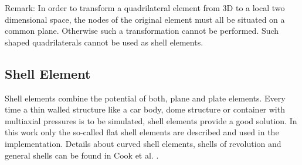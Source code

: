   Remark: In order to transform a quadrilateral element from 3D to a local two dimensional space, the nodes of the original element must all be situated on a common plane. Otherwise such a transformation cannot be performed. Such shaped quadrilaterals cannot be used as shell elements.
 
 
 \subsection{Shell Element}\label{sec:Shell-Shell}
 Shell elements combine the potential of both, plane and plate elements. Every time a thin walled structure like a car body, dome structure or container with multiaxial pressures is to be simulated, shell elements provide a good solution. In this work only the so-called flat shell elements are described and used in the implementation. Details about curved shell elements, shells of revolution and general shells can be found in Cook et al. \cite{cook2002concepts}.
 
